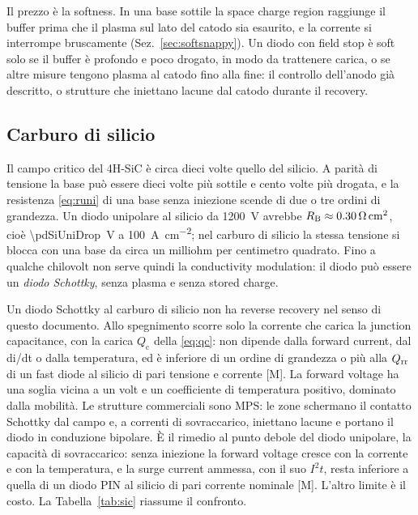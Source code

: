 \documentclass[10pt,a4paper]{scrartcl}
\let\newcommand\pdvaluedefine
\newcommand{\Qrr}{Q_\mathrm{rr}}
\newcommand{\Pp}{p\textsuperscript{+}}
\begin{document}
Il prezzo è la softness. In una base sottile la space charge region raggiunge il buffer prima che il plasma sul lato del catodo sia esaurito, e la corrente si interrompe bruscamente (Sez.~\ref{sec:softsnappy}). Un diodo con field stop è soft solo se il buffer è profondo e poco drogato, in modo da trattenere carica, o se altre misure tengono plasma al catodo fino alla fine: il controllo dell'anodo già descritto, o strutture che iniettano lacune dal catodo durante il recovery.

\subsection{Carburo di silicio}
\label{sec:sic}
Il campo critico del 4H-SiC è circa dieci volte quello del silicio. A parità di tensione la base può essere dieci volte più sottile e cento volte più drogata, e la resistenza \eqref{eq:runi} di una base senza iniezione scende di due o tre ordini di grandezza. Un diodo unipolare al silicio da \SI{1200}{\volt} avrebbe $R_\mathrm{B} \approx \SI{0.30}{\ohm\centi\metre\squared}$, cioè \SI{\pdSiUniDrop}{\volt} a \SI{100}{\ampere\per\centi\metre\squared}; nel carburo di silicio la stessa tensione si blocca con una base da circa un milliohm per centimetro quadrato. Fino a qualche chilovolt non serve quindi la conductivity modulation: il diodo può essere un \emph{diodo Schottky}, senza plasma e senza stored charge.

Un diodo Schottky al carburo di silicio non ha reverse recovery nel senso di questo documento. Allo spegnimento scorre solo la corrente che carica la junction capacitance, con la carica $Q_\mathrm{c}$ della \eqref{eq:qc}: non dipende dalla forward current, dal di/dt o dalla temperatura, ed è inferiore di un ordine di grandezza o più alla $\Qrr$ di un fast diode al silicio di pari tensione e corrente [M]. La forward voltage ha una soglia vicina a un volt e un coefficiente di temperatura positivo, dominato dalla mobilità. Le strutture commerciali sono MPS: le zone \Pp{} schermano il contatto Schottky dal campo e, a correnti di sovraccarico, iniettano lacune e portano il diodo in conduzione bipolare. È il rimedio al punto debole del diodo unipolare, la capacità di sovraccarico: senza iniezione la forward voltage cresce con la corrente e con la temperatura, e la surge current ammessa, con il suo $I^2t$, resta inferiore a quella di un diodo PIN al silicio di pari corrente nominale [M]. L'altro limite è il costo. La Tabella~\ref{tab:sic} riassume il confronto.
\end{document}
